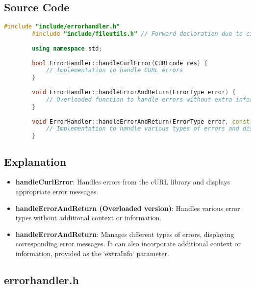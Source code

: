 \documentclass{article}
\begin{document}
	\subsection*{Source Code}
	\begin{mdframed}[backgroundcolor=background, hidealllines=false, innerleftmargin=15pt, innerrightmargin=5pt, innertopmargin=0pt, innerbottommargin=-5pt]
	\begin{lstlisting}[language=C++]
		#include "include/errorhandler.h"
		#include "include/fileutils.h" // Forward declaration due to circular dependency
		
		using namespace std;
		
		bool ErrorHandler::handleCurlError(CURLcode res) {
			// Implementation to handle CURL errors
		}
		
		void ErrorHandler::handleErrorAndReturn(ErrorType error) {
			// Overloaded function to handle errors without extra information
		}
		
		void ErrorHandler::handleErrorAndReturn(ErrorType error, const string& extraInfo = "") {
			// Implementation to handle various types of errors and display appropriate messages
		}
	\end{lstlisting}
\end{mdframed}
	\subsection*{Explanation}
	\begin{itemize}
		\item \textbf{handleCurlError}: Handles errors from the cURL library and displays appropriate error messages.
		\item \textbf{handleErrorAndReturn (Overloaded version)}: Handles various error types without additional context or information.
		\item \textbf{handleErrorAndReturn}: Manages different types of errors, displaying corresponding error messages. It can also incorporate additional context or information, provided as the `extraInfo` parameter.
	\end{itemize}
	
	\subsection{errorhandler.h}
	
\end{document}
